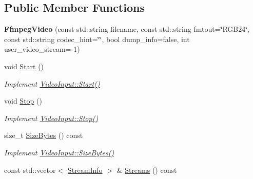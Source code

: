 \subsection*{Public Member Functions}
\begin{DoxyCompactItemize}
\item 
{\bfseries Ffmpeg\+Video} (const std\+::string filename, const std\+::string fmtout=\char`\"{}R\+G\+B24\char`\"{}, const std\+::string codec\+\_\+hint=\char`\"{}\char`\"{}, bool dump\+\_\+info=false, int user\+\_\+video\+\_\+stream=-\/1)\hypertarget{classpangolin_1_1_ffmpeg_video_a0aaac4d5d20e0aa4cdf9e057424039dc}{}\label{classpangolin_1_1_ffmpeg_video_a0aaac4d5d20e0aa4cdf9e057424039dc}

\item 
void \hyperlink{classpangolin_1_1_ffmpeg_video_a918cd0530ef8e92a11cc1568082dbe6f}{Start} ()\hypertarget{classpangolin_1_1_ffmpeg_video_a918cd0530ef8e92a11cc1568082dbe6f}{}\label{classpangolin_1_1_ffmpeg_video_a918cd0530ef8e92a11cc1568082dbe6f}

\begin{DoxyCompactList}\small\item\em Implement \hyperlink{structpangolin_1_1_video_input_a74a2e3e1b87c7cbf9de9bcb39e1df128}{Video\+Input\+::\+Start()} \end{DoxyCompactList}\item 
void \hyperlink{classpangolin_1_1_ffmpeg_video_a5da92c12324d7a9f04c76366b13b361e}{Stop} ()\hypertarget{classpangolin_1_1_ffmpeg_video_a5da92c12324d7a9f04c76366b13b361e}{}\label{classpangolin_1_1_ffmpeg_video_a5da92c12324d7a9f04c76366b13b361e}

\begin{DoxyCompactList}\small\item\em Implement \hyperlink{structpangolin_1_1_video_input_a8945f80194cc7ec9594db7f27e7d09b8}{Video\+Input\+::\+Stop()} \end{DoxyCompactList}\item 
size\+\_\+t \hyperlink{classpangolin_1_1_ffmpeg_video_ab45d5acd24526f05004815722fdcd645}{Size\+Bytes} () const \hypertarget{classpangolin_1_1_ffmpeg_video_ab45d5acd24526f05004815722fdcd645}{}\label{classpangolin_1_1_ffmpeg_video_ab45d5acd24526f05004815722fdcd645}

\begin{DoxyCompactList}\small\item\em Implement \hyperlink{structpangolin_1_1_video_input_a93cee5c33386973a2a51165e6bdcf40b}{Video\+Input\+::\+Size\+Bytes()} \end{DoxyCompactList}\item 
const std\+::vector$<$ \hyperlink{classpangolin_1_1_stream_info}{Stream\+Info} $>$ \& \hyperlink{classpangolin_1_1_ffmpeg_video_a510314ebff17c36606cf7d1f65c98934}{Streams} () const \hypertarget{classpangolin_1_1_ffmpeg_video_a510314ebff17c36606cf7d1f65c98934}{}\label{classpangolin_1_1_ffmpeg_video_a510314ebff17c36606cf7d1f65c98934}


\end{DoxyCompactItemize}
